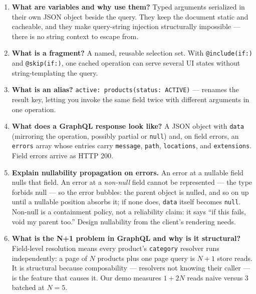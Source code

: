 \begin{enumerate}[label=\textbf{Q\arabic*.}, leftmargin=2.6em]
        Query (read), mutation (write; root fields execute serially, in
        order), subscription (selection plus an event stream, usually
        over WebSockets or SSE).
  \item \textbf{What are variables and why use them?}
        Typed arguments serialized in their own JSON object beside the
        query. They keep the document static and cacheable, and they make
        query-string injection structurally impossible --- there is no
        string context to escape from.
  \item \textbf{What is a fragment?}
        A named, reusable selection set. With \texttt{@include(if:)} and
        \texttt{@skip(if:)}, one cached operation can serve several UI
        states without string-templating the query.
  \item \textbf{What is an alias?}
        \texttt{active: products(status: ACTIVE)} --- renames the result
        key, letting you invoke the same field twice with different
        arguments in one operation.
  \item \textbf{What does a GraphQL response look like?}
        A JSON object with \texttt{data} (mirroring the operation,
        possibly partial or \texttt{null}) and, on field errors, an
        \texttt{errors} array whose entries carry \texttt{message},
        \texttt{path}, \texttt{locations}, and \texttt{extensions}.
        Field errors arrive as HTTP 200.
  \item \textbf{Explain nullability propagation on errors.}
        An error at a nullable field nulls that field. An error at a
        \emph{non-null} field cannot be represented --- the type forbids
        null --- so the error bubbles: the parent object is nulled, and
        so on up until a nullable position absorbs it; if none does,
        \texttt{data} itself becomes \texttt{null}. Non-null is a
        containment policy, not a reliability claim: it says ``if this
        fails, void my parent too.'' Design nullability from the client's
        rendering needs.
  \item \textbf{What is the N+1 problem in GraphQL and why is it
        structural?}
        Field-level resolution means every product's \texttt{category}
        resolver runs independently: a page of $N$ products plus one page
        query is $N{+}1$ store reads. It is structural because
        composability --- resolvers not knowing their caller --- is the
        feature that causes it. Our demo measures $1{+}2N$ reads naive
        versus 3 batched at $N{=}5$.

\end{enumerate}
